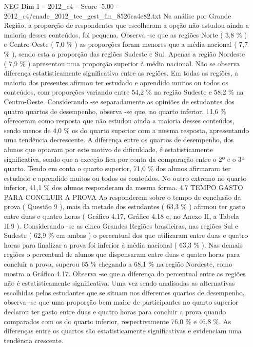 \begin{textsample}{NEG Dim 1 – 2012\_c4 – Score -5.00 – 2012\_c4/enade\_2012\_tec\_gest\_fin\_8526ca4e82.txt}
Na análise por Grande Região, a proporção de respondentes que escolheram a opção não estudou ainda a maioria desses conteúdos, foi pequena.
Observa -se que as regiões Norte ( 3,8 \% ) e Centro-Oeste ( 7,0 \% ) as proporções foram menores que a média nacional ( 7,7 \% ), sendo esta a proporção das regiões Sudeste e Sul.
Apenas a região Nordeste ( 7,9 \% ) apresentou uma proporção superior à média nacional.
Não se observa diferença estatisticamente significativa entre as regiões.
Em todas as regiões, a maioria dos presentes afirmou ter estudado e aprendido muitos ou todos os conteúdos, com proporções variando entre 54,2 \% na região Sudeste e 58,2 \% na Centro-Oeste.
Considerando -se separadamente as opiniões de estudantes dos quatro quartos de desempenho, observa -se que, no quarto inferior, 11,6 \% ofereceram como resposta que não estudou ainda a maioria desses conteúdos, sendo menos de 4,0 \% os do quarto superior com a mesma resposta, apresentando uma tendência decrescente.
A diferença entre os quartos de desempenho, dos alunos que optaram por este motivo de dificuldade, é estatisticamente significativa, sendo que a exceção fica por conta da comparação entre o 2º e o 3º quarto.
Tendo em conta o quarto superior, 71,0 \% dos alunos afirmaram ter estudado e aprendido muitos ou todos os conteúdos.
No outro extremo no quarto inferior, 41,1 \% dos alunos responderam da mesma forma. 4.7 TEMPO GASTO PARA CONCLUIR A PROVA Ao responderem sobre o tempo de conclusão da prova ( Questão 9 ), mais da metade dos estudantes ( 63,3 \% ) afirmou ter gasto entre duas e quatro horas ( Gráfico 4.17, Gráfico 4.18 e, no Anexo II, a Tabela II.9 ).
Considerando -se as cinco Grandes Regiões brasileiras, nas regiões Sul e Sudeste ( 62,9 \% em ambas ) o percentual dos que utilizaram entre duas e quatro horas para finalizar a prova foi inferior à média nacional ( 63,3 \% ).
Nas demais regiões o percentual de alunos que dispensaram entre duas e quatro horas para concluir a prova, superou 65 \% chegando a 68,1 \% na região Nordeste, como mostra o Gráfico 4.17.
Observa -se que a diferença do percentual entre as regiões não é estatisticamente significativa.
Uma vez sendo analisadas as alternativas escolhidas pelos estudantes que se situam nos diferentes quartos de desempenho, observa -se que uma proporção bem maior de participantes no quarto superior declarou ter gasto entre duas e quatro horas para concluir a prova quando comparados com os do quarto inferior, respectivamente 76,0 \% e 46,8 \%.
As diferenças entre os quartos são estatisticamente significativas e evidenciam uma tendência crescente.

\end{textsample}

